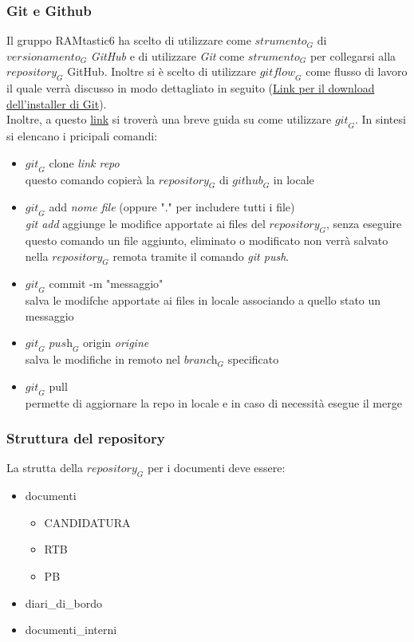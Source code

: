\subsubsection{Git e Github}
Il gruppo RAMtastic6 ha scelto di utilizzare come $\textit{strumento}_G$ di $\textit{versionamento}_G$ \emph{GitHub} e di utilizzare \emph{Git} come $\textit{strumento}_G$ per collegarsi alla $\textit{repository}_G$ GitHub.
Inoltre si è scelto di utilizzare $\textit{gitflow}_G$ come flusso di lavoro il quale verrà discusso in modo dettagliato in seguito
(\href{https://git-scm.com/downloads}{Link per il download dell'installer di Git}).\\
Inoltre, a questo \href{https://rogerdudler.$\textit{git}_G$hub.io/$\textit{git}_G$-guide/index.it.html}{link} si troverà una breve guida su come utilizzare $\textit{git}_G$.
In sintesi si elencano i pricipali comandi:
\begin{itemize}
    \item $\textit{git}_G$ clone \emph{link repo}\\
    questo comando copierà la $\textit{repository}_G$ di $\textit{github}_G$ in locale
    \item $\textit{git}_G$ add \emph{nome file} (oppure "." per includere tutti i file)\\
    \emph{git add} aggiunge le modifice apportate ai files del $\textit{repository}_G$, senza eseguire questo comando un file aggiunto, eliminato o modificato non verrà salvato nella $\textit{repository}_G$ remota tramite il comando \emph{git push}.
    \item $\textit{git}_G$ commit -m "messaggio" \\
    salva le modifche apportate ai files in locale associando a quello stato un messaggio
    \item $\textit{git}_G$ $\textit{push}_G$ origin \emph{origine} \\
    salva le modifiche in remoto nel $\textit{branch}_G$ specificato
    \item $\textit{git}_G$ pull \\
    permette di aggiornare la repo in locale e in caso di necessità esegue il merge
\end{itemize}
\subsubsection{Struttura del repository}
La strutta della $\textit{repository}_G$ per i documenti deve essere:
\begin{itemize}
    \item documenti
    \begin{itemize}
        \item CANDIDATURA
        \item RTB
        \item PB
    \end{itemize}
    \item diari\_di\_bordo
    \item documenti\_interni
\end{itemize}
